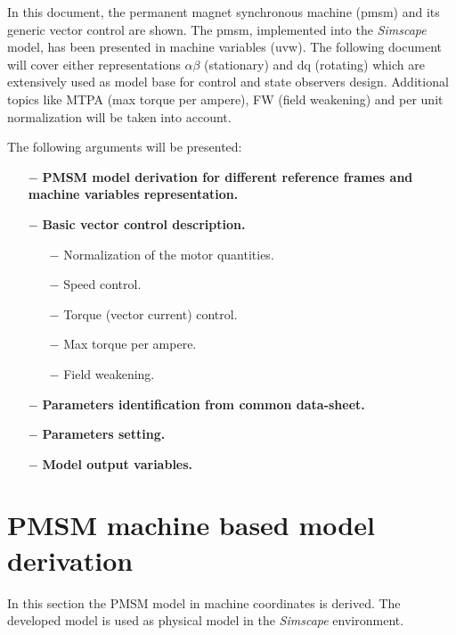\documentclass[11pt,a4paper]{article}
\title{\textbf{ 
		\begin{LARGE}
			Permanent Magnet Synchronous Machine
		\end{LARGE} \\[24pt]
		\begin{Large}
			Model and Control Strategies  
	\end{Large}}
}
\author{\textbf{Davide Bagnara}}
\numberwithin{equation}{section}
\theoremstyle{it}
\theoremstyle{definition}
\begin{document}
	\begin{onehalfspace}
	\thispagestyle{firstpage}
	\begin{mybox}
		\maketitle
		\vspace{125mm}
	\end{mybox}
	\newpage
	\tableofcontents
	\listoffigures	
	\listoftables
	\newpage
	
	{In this document, the permanent magnet synchronous machine (pmsm) and its generic vector control are shown. The pmsm, implemented into the \textit{Simscape} model, has been presented in machine variables (uvw). The following document will cover either representations $\alpha\beta$ (stationary) and dq (rotating) which are extensively used as model base for control and state observers design. Additional topics like MTPA (max torque per ampere), FW (field weakening) and per unit normalization will be taken into account. 
		
	\noindent The following arguments will be presented:
	\begin{itemize}
		\item[$-$] \textbf{PMSM model derivation for different reference frames and machine variables representation.}
		\item[$-$] \textbf{Basic vector control description.}
		\begin{itemize}
			\item[$-$] Normalization of the motor quantities.
			\item[$-$] Speed control.
			\item[$-$] Torque (vector current) control.
			\item[$-$] Max torque per ampere.
			\item[$-$] Field weakening.
		\end{itemize}
		\item[$-$] \textbf{Parameters identification from common data-sheet.}
		\item[$-$] \textbf{Parameters setting.}
		\item[$-$] \textbf{Model output variables.}
\end{itemize}}


\section{PMSM machine based model derivation}
In this section the PMSM model in machine coordinates is derived. The developed model is used as physical model in the \textit{Simscape} environment.


\end{onehalfspace}
\end{document}

